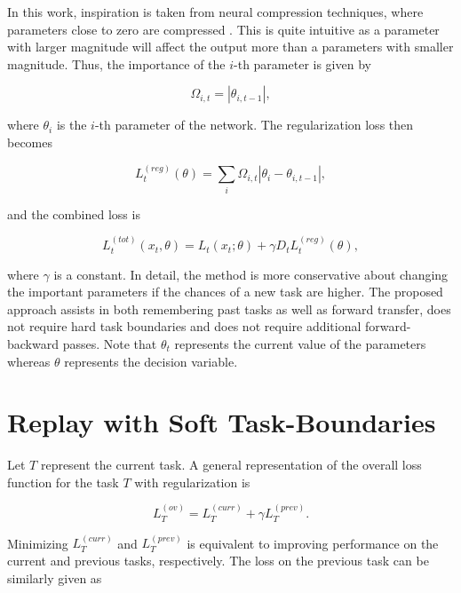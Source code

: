 \documentclass[lettersize,journal]{IEEEtran}
\begin{document}
 In this work, inspiration is taken from neural compression techniques, where parameters close to zero are compressed \cite{li2016pruning}. This is quite intuitive as a parameter with larger magnitude will affect the output more than a parameters with smaller magnitude. Thus, the importance of the $i$-th parameter is given by 
 
 \begin{equation}
    \Omega_{i, t} = |\theta_{i, t-1}|,
 \end{equation}
 
 \noindent where $\theta_i$ is the $i$-th parameter of the network. The regularization loss then becomes 
 
 \begin{equation}
    L_t^{(reg)}(\theta) = \sum_i  \Omega_{i, t} |\theta_i - \theta_{i, t -1}|, 
 \end{equation}
 
 \noindent and the combined loss is
 
 \begin{equation}
    L_t^{(tot)}(x_t, \theta) = L_t(x_t; \theta) + \gamma D_t L_t^{(reg)}(\theta),
 \end{equation}
 
 \noindent where $\gamma$ is a constant. In detail, the method is more conservative about changing the important parameters if the chances of a new task are higher. The proposed approach assists in both remembering past tasks as well as forward transfer, does not require hard task boundaries and does not require additional forward-backward passes. Note that $\theta_t$ represents the current value of the parameters whereas $\theta$ represents the decision variable. 
 
 \section{Replay with Soft Task-Boundaries}
 \noindent Let $T$ represent the current task. A general representation of the overall loss function for the task $T$ with regularization is  
 
 \begin{equation} 
    L_T^{(ov)} = L_T^{(curr)} + \gamma L_T^{(prev)}.
 \end{equation}
 
 \noindent Minimizing $L_T^{(curr)}$ and $L_T^{(prev)}$ is equivalent to improving performance on the current and previous tasks, respectively. The loss on the previous task can be similarly given as 
 
\end{document}
